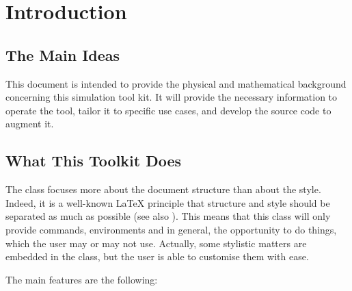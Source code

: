 \setchapterpreamble[u]{\margintoc}
\chapter{Introduction}

\section{The Main Ideas}

This document is intended to provide the physical and mathematical background concerning this simulation tool kit. It will provide the necessary information to operate the tool, tailor it to specific use cases, and develop the source code to augment it.

\section{What This Toolkit Does}

The  class focuses more about the document structure than 
about the style. Indeed, it is a well-known \LaTeX\xspace principle that 
structure and style should be separated as much as possible (see also 
). This means that this class will only provide 
commands, environments and in general, the opportunity to do things, 
which the user may or may not use. Actually, some stylistic matters are 
embedded in the class, but the user is able to customise them with ease.

The main features are the following:

